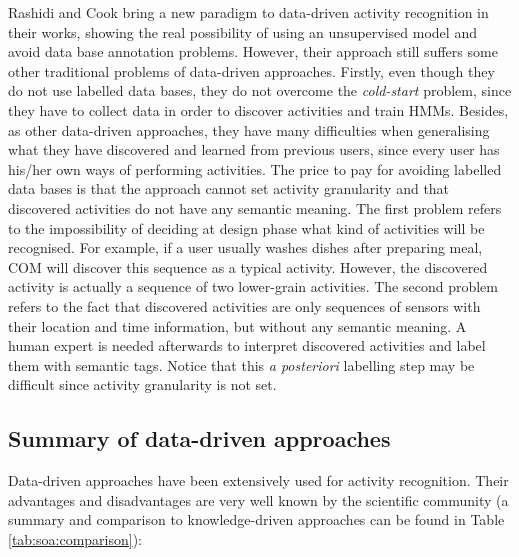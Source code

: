 Rashidi and Cook bring a new paradigm to data-driven activity recognition in their works, showing the real possibility of using an unsupervised model and avoid data base annotation problems. However, their approach still suffers some other traditional problems of data-driven approaches. Firstly, even though they do not use labelled data bases, they do not overcome the \textit{cold-start} problem, since they have to collect data in order to discover activities and train HMMs. Besides, as other data-driven approaches, they have many difficulties when generalising what they have discovered and learned from previous users, since every user has his/her own ways of performing activities. The price to pay for avoiding labelled data bases is that the approach cannot set activity granularity and that discovered activities do not have any semantic meaning. The first problem refers to the impossibility of deciding at design phase what kind of activities will be recognised. For example, if a user usually washes dishes after preparing meal, COM will discover this sequence as a typical activity. However, the discovered activity is actually a sequence of two lower-grain activities. The second problem refers to the fact that discovered activities are only sequences of sensors with their location and time information, but without any semantic meaning. A human expert is needed afterwards to interpret discovered activities and label them with semantic tags. Notice that this \textit{a posteriori} labelling step may be difficult since activity granularity is not set. 


\subsection{Summary of data-driven approaches}

Data-driven approaches have been extensively used for activity recognition. Their advantages and disadvantages are very well known by the scientific community (a summary and comparison to knowledge-driven approaches can be found in Table \ref{tab:soa:comparison}):

